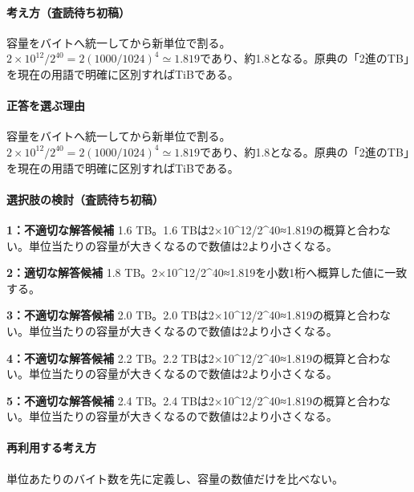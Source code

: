 \paragraph{考え方（査読待ち初稿）} 容量をバイトへ統一してから新単位で割る。\(2\times10^{12}/2^{40}=2(1000/1024)^4\simeq1.819\)であり、約1.8となる。原典の「2進のTB」を現在の用語で明確に区別すればTiBである。

\paragraph{正答を選ぶ理由} 容量をバイトへ統一してから新単位で割る。\(2\times10^{12}/2^{40}=2(1000/1024)^4\simeq1.819\)であり、約1.8となる。原典の「2進のTB」を現在の用語で明確に区別すればTiBである。

\paragraph{選択肢の検討（査読待ち初稿）}

\noindent\textbf{1：不適切な解答候補} 1.6 TB。1.6 TBは2×10\textasciicircum{}12/2\textasciicircum{}40≈1.819の概算と合わない。単位当たりの容量が大きくなるので数値は2より小さくなる。\par

\noindent\textbf{2：適切な解答候補} 1.8 TB。2×10\textasciicircum{}12/2\textasciicircum{}40≈1.819を小数1桁へ概算した値に一致する。\par

\noindent\textbf{3：不適切な解答候補} 2.0 TB。2.0 TBは2×10\textasciicircum{}12/2\textasciicircum{}40≈1.819の概算と合わない。単位当たりの容量が大きくなるので数値は2より小さくなる。\par

\noindent\textbf{4：不適切な解答候補} 2.2 TB。2.2 TBは2×10\textasciicircum{}12/2\textasciicircum{}40≈1.819の概算と合わない。単位当たりの容量が大きくなるので数値は2より小さくなる。\par

\noindent\textbf{5：不適切な解答候補} 2.4 TB。2.4 TBは2×10\textasciicircum{}12/2\textasciicircum{}40≈1.819の概算と合わない。単位当たりの容量が大きくなるので数値は2より小さくなる。\par

\paragraph{再利用する考え方} 単位あたりのバイト数を先に定義し、容量の数値だけを比べない。

